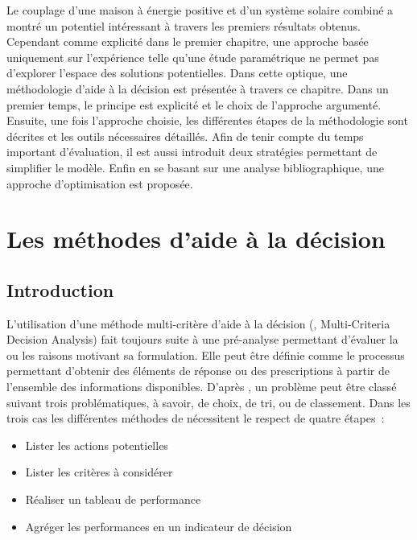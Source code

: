 

Le couplage d’une maison à énergie positive et d’un système solaire combiné a montré un
potentiel intéressant à travers les premiers résultats obtenus. Cependant comme explicité
dans le premier chapitre, une approche basée uniquement sur l’expérience telle qu’une
étude paramétrique ne permet pas d’explorer l’espace des solutions potentielles. Dans
cette optique, une méthodologie d’aide à la décision est présentée à travers ce chapitre.
Dans un premier temps, le principe est explicité et le choix de l’approche argumenté.
Ensuite, une fois l’approche choisie, les différentes étapes de la méthodologie sont
décrites et les outils nécessaires détaillés. Afin de tenir compte du temps important
d’évaluation, il est aussi introduit deux stratégies permettant de simplifier le modèle.
Enfin en se basant sur une analyse bibliographique, une approche d’optimisation est
proposée.
\clearpage


\section{Les méthodes d’aide à la décision} %
\label{sec:les_methodes_d_aide_a_la_decision}
\subsection{Introduction} %
\label{sub:mcda_introduction}
L’utilisation d’une méthode multi-critère d’aide à la décision (, Multi-Criteria
Decision Analysis) fait toujours suite à une pré-analyse permettant d’évaluer la ou les
raisons motivant sa formulation. Elle peut être définie comme le processus permettant
d’obtenir des éléments de réponse ou des prescriptions à partir de l’ensemble des
informations disponibles. D’après \textcite{Roy1996}, un problème peut être
classé suivant trois problématiques, à savoir, de choix, de tri, ou de classement. Dans les
trois cas les différentes méthodes de  nécessitent le respect de quatre étapes~:
\begin{itemize}
  \item Lister les actions potentielles
  \item Lister les critères à considérer
  \item Réaliser un tableau de performance
  \item Agréger les performances en un indicateur de décision
\end{itemize}

